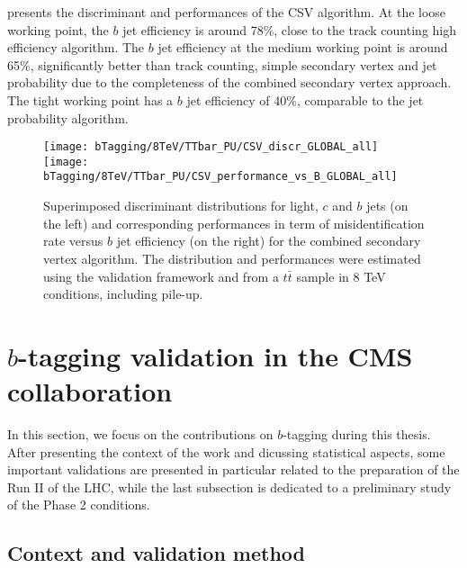      presents the discriminant and
    performances of the CSV algorithm. At the loose working point, the $b$ jet efficiency is
    around 78\%, close to the track counting high efficiency algorithm. The $b$ jet efficiency
    at the medium working point is around 65\%, significantly better than track counting,
    simple secondary vertex and jet probability due to the completeness of the combined
    secondary vertex approach. The tight working point has a $b$ jet efficiency of 40\%,
    comparable to the jet probability algorithm.

    \begin{figure}[th!]
        \centering
        \begin{minipage}{\textwidth}
        \texttt{[image: bTagging/8TeV/TTbar\_PU/CSV\_discr\_GLOBAL\_all]}
        \texttt{[image: bTagging/8TeV/TTbar\_PU/CSV\_performance\_vs\_B\_GLOBAL\_all]}
        \end{minipage}
        \caption{Superimposed discriminant distributions for light, $c$ and $b$ jets (on
        the left) and corresponding performances in term of misidentification rate versus $b$ jet efficiency
        (on the right) for the combined secondary vertex algorithm.
        The distribution and performances were estimated using the validation framework and from
        a $t\bar{t}$ sample in 8 TeV conditions, including pile-up.}
        \label{fig:bTagging/perfCSV}
    \end{figure}

    \section{$b$-tagging validation in the CMS collaboration \label{sec:bTagValidation}}

    In this section, we focus on the contributions on $b$-tagging during this thesis.
    After presenting the context of the work and dicussing statistical aspects, some
    important validations are presented in particular related to the preparation of the
    Run II of the LHC, while the last subsection is dedicated to a preliminary study of
    the Phase 2 conditions.

        \subsection{Context and validation method}

